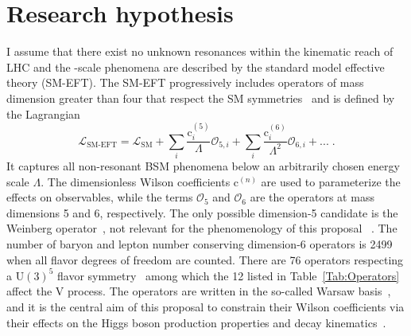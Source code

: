 \documentclass[a4paper,11pt]{article}
\newcommand{\Pb}{{{\Pqb}}\xspace}
\newcommand{\PAb}{{{{\Paqb}}}\xspace}
\renewcommand{\PV}{{{{V}}}\xspace}
\newcommand{\VH}{{{\PV}{\PH}}\xspace}
\begin{document}
\section{Research hypothesis}
\label{sec:research_hypo}


I assume that there exist no unknown resonances within the kinematic reach of LHC and 
the {\TeV}-scale phenomena are described by the standard model effective theory (SM-EFT). 
The SM-EFT progressively includes operators of mass dimension greater than four that respect the SM symmetries~\cite{Jenkins:2013zja,Alonso:2013hga,Jenkins:2013wua,Englert:2014cva,Brivio:2017vri} and is defined by the Lagrangian
\begin{equation}
\mathcal{L}_{\text{SM-EFT}} = \mathcal{L}_{\text{SM}} +  {\sum}_{i} \frac{\text{c}_i^{\left(5\right)}}{\Lambda} \mathcal{O}_{5,i} + {\sum}_{i} \frac{\text{c}_i^{\left(6\right)}}{{\Lambda}^{2}} \mathcal{O}_{6,i} + ... \;.
\label{Eq:SMEFT}
\end{equation}
It captures all non-resonant BSM phenomena below an arbitrarily chosen energy scale $\Lambda$.
The dimensionless Wilson coefficients $\text{c}^{\left(n\right)}$ are used to parameterize the effects on observables, while the terms $\mathcal{O}_5$ and $\mathcal{O}_6$ are  the operators at mass dimensions 5 and 6, respectively.
The only possible dimension-5 candidate is the  Weinberg operator~\cite{PhysRevLett.43.1566}, not relevant for the phenomenology of this proposal ~\cite{Bonnet:2009ej}.
The number of baryon and lepton number conserving dimension-6 operators is 2499 when all flavor degrees of freedom are counted. There are 76 operators respecting a $\textrm{U}(3)^5$ flavor symmetry~\cite{Alonso:2013hga} among which the 12 listed in Table~\ref{Tab:Operators} affect the \VH process.
The operators are written in the so-called Warsaw basis~\cite{Grzadkowski:2010es}, and it is the central aim of this proposal to constrain their Wilson coefficients via their effects on the Higgs boson production properties and decay kinematics~\cite{Hagiwara:1993qt,Ellis:2014dva,Murphy:2017omb,Baglio:2020oqu}.
\end{document}
